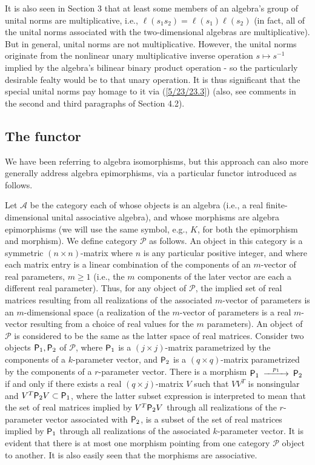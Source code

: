 \documentclass{amsart}
\numberwithin{equation}{section}
\theoremstyle{definition}
\numberwithin{theorem}{section}
\begin{document}
It is also seen in Section 3 that at least some members of an algebra's group of unital norms are multiplicative, i.e., $\ell(s_1s_2) = \ell(s_1)\ell(s_2)$ (in fact, all of the unital norms associated with the two-dimensional algebras are multiplicative).   But in general, unital norms are not multiplicative.  However, the unital norms originate from the nonlinear unary multiplicative inverse operation $s\mapsto s^{-1}$ implied by the algebra's bilinear binary product operation - so the particularly desirable fealty would be to that unary operation.  It is thus significant that the special unital norms pay homage to it via (\ref{5/23/23.3}) (also, see comments in the second and third paragraphs of Section 4.2). 

\subsection{The functor}

We have been referring to algebra isomorphisms, but this approach can also more generally address algebra epimorphisms, via a particular functor introduced as follows.  

Let $\mathcal{A}$ be the category each of whose objects is an algebra (i.e., a real finite-dimensional unital associative algebra), and whose morphisms are algebra epimorphisms (we will use the same symbol, e.g., $K$, for both the epimorphism and morphism).  We define category $\mathcal{P}$ as follows. An object in this category is a symmetric $(n\times n)$-matrix where $n$ is any particular positive integer, and where each matrix entry is a linear combination of the components of an $m$-vector of real parameters, $m\ge 1$ (i.e., the $m$ components of the later vector are each a different real parameter).  Thus, for any object of $\mathcal{P}$, the implied set of real matrices resulting from all realizations of the associated $m$-vector of parameters is an $m$-dimensional space (a realization of the $m$-vector of parameters is a real $m$-vector resulting from a choice of real values for the $m$ parameters).  An object of $\mathcal{P}$ is considered to be the same as the latter space of real matrices.  Consider two objects ${\sf P}_1,{\sf P}_2$ of $\mathcal{P}$, where ${\sf P}_1$ is a $(j\times j)$-matrix parametrized by the components of a $k$-parameter vector, and ${\sf P}_2$ is a $(q\times q)$-matrix parametrized by the components of a $r$-parameter vector.  There is a morphism $ \begin{CD}  {\sf P}_1 @>p_1>> {\sf P}_2\end{CD}$ if and only if  there exists a real $(q\times j)$-matrix $V$ such that $VV^T$ is nonsingular and $V^T{\sf P}_2V\subset {\sf P}_1$, where the latter subset expression is 
interpreted to mean that the set of real matrices implied by $V^T{\sf P}_2V$ through all realizations of the $r$-parameter vector associated with ${\sf P}_2$, is a subset of  the set of real matrices implied by  ${\sf P}_1$ through all realizations of the associated $k$-parameter vector. It is evident that there is at most one morphism pointing from one category $\mathcal{P}$ object to another.  It is also easily seen that the morphisms are associative.  
\end{document}
